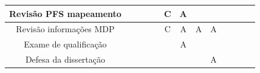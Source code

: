 \documentclass[10pt]{beamer}
\begin{document}
\begin{frame}
\begin{table}[htb]
{\begin{tabular}{|c|c|c|c|c|c|c|c|c|c|c|c|c|}
				\hline
				Revisão PFS mapeamento
				&
				&
				&
				&
				& \cellcolor[HTML]{9AFF99}C
				& \cellcolor[HTML]{FFCB2F}A
				&
				& \\
				
				\hline
				Revisão informações MDP
				&
				&
				&
				&
				& \cellcolor[HTML]{9AFF99}C
				& \cellcolor[HTML]{FFCB2F}A
				& \cellcolor[HTML]{FFCB2F}A
				& \cellcolor[HTML]{FFCB2F}A \\
				
				\hline
				Exame de qualificação
				&
				& 
				&
				&
				&
				& \cellcolor[HTML]{FFCB2F}A
				&
				& \\
				
				\hline
				Defesa da dissertação
				&
				&
				&
				&
				&
				&
				&
				& \cellcolor[HTML]{FFCB2F}A \\
				\hline
				
		\end{tabular}}
	\end{table}
	
	
\end{frame}

\end{document}
